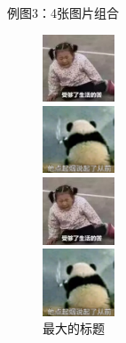 \documentclass[UTF8]{ctexart}
\begin{document}
    例图3：4张图片组合
    \begin{figure}
    	\begin{minipage}{0.5\linewidth}
    		\begin{flushright} %
    			\includegraphics[height=2cm]{2.jpg}
    		\end{flushright}
    	\end{minipage}
    	\begin{minipage}{0.5\linewidth}
    		\begin{flushleft} %
    			\includegraphics[height=2cm]{3.jpg}
    		\end{flushleft}
    	\end{minipage}
    	\begin{minipage}{0.5\linewidth}
    		\begin{flushright}
    			\includegraphics[height=2cm]{2.jpg}
    		\end{flushright}
    	\end{minipage}
    	\begin{minipage}{0.5\linewidth}
    		\begin{flushleft}
    			\includegraphics[height=2cm]{3.jpg}
    		\end{flushleft}
    	\end{minipage}
    	\caption{最大的标题}
    \end{figure}
\end{document}
